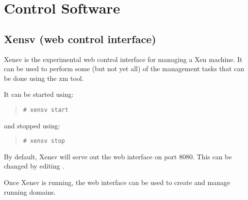 \chapter{Control Software} 

\section{Xensv (web control interface)}
\label{s:xensv}

Xensv is the experimental web control interface for managing a Xen
machine. It can be used to perform some (but not yet all) of the
management tasks that can be done using the xm tool.

It can be started using:
\begin{quote}
  \verb_# xensv start_
\end{quote}
and stopped using:
\begin{quote}
  \verb_# xensv stop_
\end{quote}

By default, Xensv will serve out the web interface on port 8080. This
can be changed by editing
.

Once Xensv is running, the web interface can be used to create and
manage running domains.

